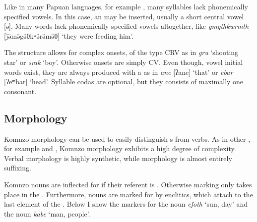 Like in many Papuan languages, for example  \citep{Blevins:2010ee}, many syllables lack phonemically specified vowels. In this case, an  may be inserted, usually a short central vowel [ə]. Many words lack phonemically specified vowels altogether, like \emph{ymgthkwrmth} [jə̆mə̆{\ᵑ}gə̆θkʷə̆rə̆mə̆θ] `they were feeding him'.%

The  structure allows for complex onsets, of the type CRV as in \emph{gru} `shooting star' or \emph{srak} `boy'. Otherwise onsets are simply CV. Even though, vowel initial words exist, they are always produced with a  as in \emph{ane} [ʔane] `that' or \emph{ebar} [ʔeᵐbar] `head'. Syllable codas are optional, but they consists of maximally one consonant.

\subsection{Morphology}

Komnzo morphology can be used to easily distinguish s from verbs. As in other , for example  \citep{Siegel:2015bp} and  \citep{Evans:2015to}, Komnzo  morphology exhibits a high degree of complexity. Verbal morphology is highly synthetic, while  morphology is almost entirely suffixing.%

Komnzo nouns are inflected for  if their referent is . Otherwise  marking only takes place in the . Furthermore, nouns are marked for  by enclitics, which attach to the last element of the . Below I show the  markers for the  noun \emph{efoth} `sun, day' and the  noun \emph{kabe} `man, people'.

